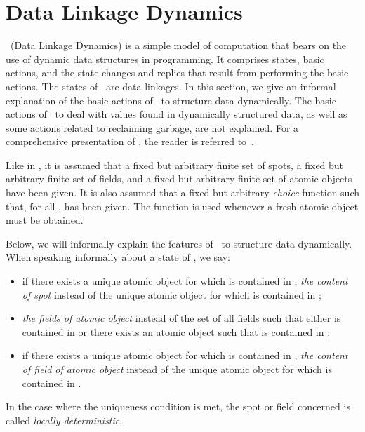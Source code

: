 \documentclass[fleqn]{llncs}
\begin{document}
\section{Data Linkage Dynamics}
\label{sect-DLD}

\DLD\ (Data Linkage Dynamics) is a simple model of computation that
bears on the use of dynamic data structures in programming.
It comprises states, basic actions, and the state changes and
replies that result from performing the basic actions.
The states of \DLD\ are data linkages.
In this section, we give an informal explanation of the basic actions of
\DLD\ to structure data dynamically.
The basic actions of \DLD\ to deal with values found in dynamically
structured data, as well as some actions related to reclaiming garbage,
are not explained.
For a comprehensive presentation of \DLD, the reader is referred
to~\cite{BM08d}.

Like in \DLA, it is assumed that a fixed but arbitrary finite set
 of spots, a fixed but arbitrary finite set  of fields,
and a fixed but arbitrary finite set  of atomic objects have
been given.
It is also assumed that a fixed but arbitrary \emph{choice}
function  such
that, for all , 
has been given.
The function  is used whenever a fresh atomic object must be
obtained.

Below, we will informally explain the features of \DLD\ to structure data
dynamically.
When speaking informally about a state  of \DLD, we say:
\begin{itemize}
\item
if there exists a unique atomic object  for which  is
contained in , \emph{the content of spot } instead of the unique
atomic object  for which  is contained in ;
\item
\emph{the fields of atomic object } instead of the set of all fields
 such that either  is contained in  or there
exists an atomic object  such that  is contained in
;
\item
if there exists a unique atomic object  for which 
is contained in , \emph{the content of field  of atomic object
} instead of the unique atomic object  for which 
is contained in .
\end{itemize}
In the case where the uniqueness condition is met, the spot or field
concerned is called \emph{locally deterministic}.
\end{document}
